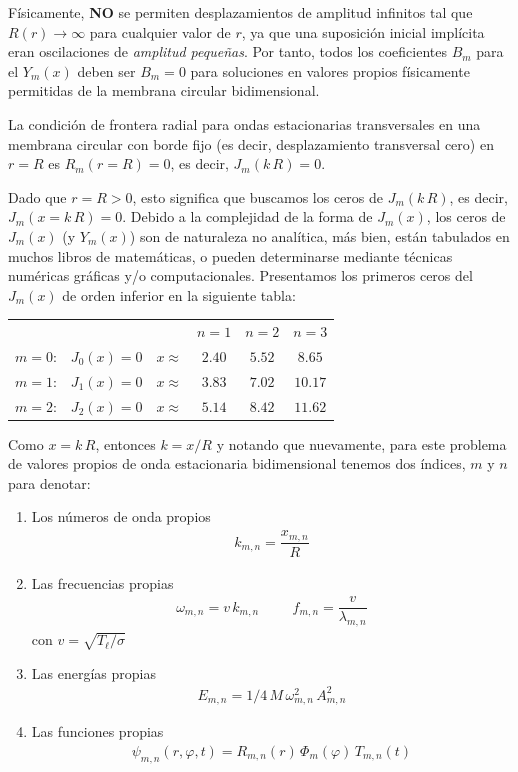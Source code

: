 Físicamente, \textbf{NO} se permiten desplazamientos de amplitud infinitos tal que $R(r) \to \infty$ para cualquier valor de $r$, ya que una suposición inicial implícita eran oscilaciones de \emph{amplitud pequeñas}. Por tanto, todos los coeficientes $B_{m}$ para el $Y_{m} (x)$ deben ser $B_{m} = 0$ para soluciones en valores propios físicamente permitidas de la membrana circular bidimensional.
\par
La condición de frontera radial para ondas estacionarias transversales en una membrana circular con borde fijo (es decir, desplazamiento transversal cero) en $r = R$ es $R_{m} (r = R) = 0$, es decir, $J_{m} (k \, R) = 0$.
\par
Dado que $r = R > 0$, esto significa que buscamos los ceros de $J_{m} (k \, R)$, es decir, $J_{m} (x = k \,R) = 0$. Debido a la complejidad de la forma de $J_{m} (x)$, los ceros de $J_{m} (x)$ (y $Y_{m} (x)$) son de naturaleza no analítica, más bien, están tabulados en muchos libros de matemáticas, o pueden determinarse mediante técnicas numéricas gráficas y/o computacionales. Presentamos los primeros ceros del $J_{m} (x)$ de orden inferior en la siguiente tabla:
\begin{table}[H]
\centering
\begin{tabular}{c c r c c c}
 & & & $n = 1$ & $n = 2$ & $n = 3$ \\
$m = 0$: & $J_{0}(x) = 0$ & $x \approx$ & $2.40$ & $5.52$ & $8.65$ \\
$m = 1$: & $J_{1}(x) = 0$ & $x \approx$ & $3.83$ & $7.02$ & $10.17$ \\
$m = 2$: & $J_{2}(x) = 0$ & $x \approx$ & $5.14$ & $8.42$ & $11.62$ \\
\end{tabular}
\end{table}
Como $x = k \, R$, entonces $k = x / R$ y notando que nuevamente, para este problema de valores propios de onda estacionaria bidimensional tenemos dos índices, $m$ y $n$ para denotar:
\begin{enumerate}
\item Los números de onda propios 
\begin{align*}
k_{m, n} = \dfrac{x_{m, n}}{R}
\end{align*}
\item Las frecuencias propias
\begin{align*}
\omega_{m,n} = v \, k_{m, n} \hspace{1cm} f_{m,n} = \dfrac{v}{\lambda_{m,n}}
\end{align*}
con $v = \sqrt{T_{\ell} / \sigma}$
\item Las energías propias 
\begin{align*}
E_{m,n} = 1/4 \, M \, \omega_{m,n}^{2} \, A_{m,n}^{2}
\end{align*}
\item Las funciones propias 
\begin{align*}
\psi_{m,n} (r, \varphi, t) = R_{m,n}(r) \, \Phi_{m}(\varphi) \, T_{m,n}(t)
\end{align*}
\end{enumerate}
